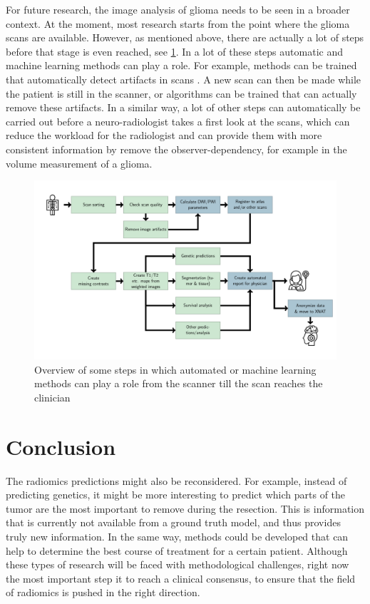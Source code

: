 For future research, the image analysis of glioma needs to be seen in a broader context.
At the moment, most research starts from the point where the glioma scans are available.
However, as mentioned above, there are actually a lot of steps before that stage is even reached, see \cref{fig:discussion_pipeline_automatic}.
In a lot of these steps automatic and machine learning methods can play a role.
For example, methods can be trained that automatically detect artifacts in scans \autocite{kustner2018artifacts}.
A new scan can then be made while the patient is still in the scanner, or algorithms can be trained that can actually remove these artifacts.
In a similar way, a lot of other steps can automatically be carried out before a neuro-radiologist takes a first look at the scans, which can reduce the workload for the radiologist and can provide them with more consistent information by remove the observer-dependency, for example in the volume measurement of a \gls{glioma}.


\begin{figure}[htbp]
\includegraphics[width=\textwidth]{Figures/Pipeline.png}
\caption{Overview of some steps in which automated or machine learning methods can play a role from the scanner till the scan reaches the clinician}\label{fig:discussion_pipeline_automatic}
\end{figure}

\section{Conclusion}\label{sec:discussion_conclusion}

The radiomics predictions might also be reconsidered.
For example, instead of predicting genetics, it might be more interesting to predict which parts of the \gls{tumor} are the most important to remove during the resection.
This is information that is currently not available from a ground truth model, and thus provides truly new information.
In the same way, methods could be developed that can help to determine the best course of treatment for a certain patient.
Although these types of research will be faced with methodological challenges, right now the most important step it to reach a clinical consensus, to ensure that the field of radiomics is pushed in the right direction.


